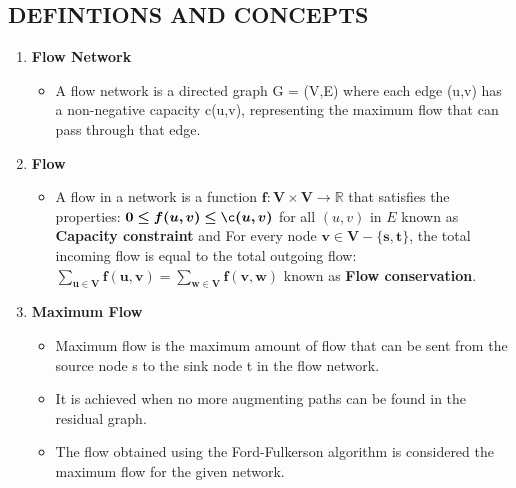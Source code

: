 \documentclass{article}
\begin{document}
\subsection{\textbf{ DEFINTIONS AND CONCEPTS}}
\vspace{0.5cm}
{\fontsize{15}{15}\selectfont
\begin{enumerate}
    \item \textbf{Flow Network}
    \begin{itemize}
        \item  A flow network is a directed graph G = (V,E) where each edge (u,v) has a non-negative capacity c(u,v), representing the maximum flow that can pass through that edge.
    \end{itemize}
    \vspace{0.7cm}
    
    \item \textbf{Flow} 
    \begin{itemize}
         \item A flow in a network is a function \( \bm{f: V \times V \rightarrow \mathbb{R} }\) that satisfies the properties:
        \( \bm{0 \leq f(u, v) \leq \c(u, v)} \) for all \( (u, v) \) in \( E \) known as \textbf{Capacity constraint} and 
         For every node \( \bm{v \in V - \{s, t\}} \), the total incoming flow is equal to the total outgoing flow: \( \bm{\sum_{u \in V} f(u, v) = \sum_{w \in V} f(v, w)} \) known as \textbf{Flow conservation}.
    \end{itemize}
    \vspace{0.7cm}

    \item \textbf{Maximum Flow}
    \begin{itemize}
        \item  Maximum flow is the maximum amount of flow that can be sent from the source node s to the sink node t in the flow network.
        \item It is achieved when no more augmenting paths can be found in the residual graph.
        \item The flow obtained using the Ford-Fulkerson algorithm is considered the maximum flow for the given network.
    \end{itemize}
    \vspace{0.7cm}


\end{enumerate}}
\end{document}
